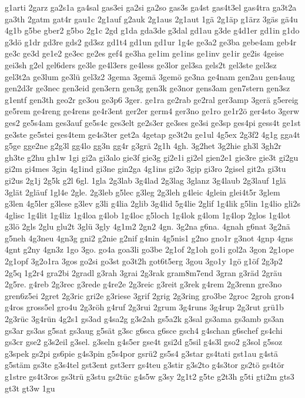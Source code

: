 {g1arti
2garz
ga2s1a
ga4sal
gas3ei
ga2si
ga2so
gas3s
ga4st
gas4t3el
gas4tra
ga3t2a
ga3th
2gatm
gat4r
gau1c
2g1auf
g2auk
2g1aus
2g1aut
1gä
2g1äp
g1ärz
3gäs
gä4u
4g1b
g5be
gber2
g5bo
2g1c
2gd
g1da
gda3de
g3dal
gd1au
g3de
g4d1er
gd1in
g1do
g3dö
g1dr
gd3re
gds2
gd3sz
gd1t4
gd1un
gd1ur
1g4e
ge3a2
ge3ba
gebe4am
geb4r
ge3c
ge3d
ge1e2
ge3ec
ge2es
gef4
ge3ha
ge1im
ge1ins
ge1inv
ge1ir
ge2is
4geise
gei3sh
g2el
gel6ders
ge3le
ge4l3ers
ge4less
ge3lor
gel3sa
gels2t
gel3ste
gel3sz
gel3t2a
ge3lum
ge3lü
gel3z2
3gema
3gemä
3gemö
ge3na
ge4nam
gen2au
gen4aug
gen2d3r
ge3nec
gen3eid
gen3ern
gen3g
gen3k
ge3nor
gens3am
gen7stern
gen3sz
g1entf
gen3th
geo2r
ge3ou
ge3p6
3ger.
ge1ra
ge2rab
ge2ral
ger3amp
3gerä
g5ereig
ge5rem
ge4reng
ge4rens
ge4r3ent
ger2er
germ4
ger3no
ge1ro
ge1r2ö
ger4sto
3gerw
ges2
ge5s4am
ges3auf
ge5s4c
ges3elt
ge2s3er
ge3ses
ge3si
ge3sp
ges4pi
gess4t
ge1st
ge3ste
ge5stei
ges4tem
ge4s3ter
get2a
4getap
ge3t2u
ge1ul
4g5ex
2g3f2
4g1g
gga4t
g5ge
gge2ne
g2g3l
gg4lo
gg3n
gg4r
g3grä
2g1h
4gh.
3g2het
3g2hie
gh3l
3gh2r
gh3te
g2hu
gh1w
1gi
gi2a
gi3alo
gie3f
gie3g
gi2e1i
gi2el
gien2e1
gie3re
gie3t
gi2gu
gi2m
gi4mes
3gin
4g1ind
gi3ne
gin2ga
4g1ins
gi2o
3gip
gi3ro
2gisel
git2a
gi3tu
gi2us
2g1j
2g5k
g2l
6gl.
1gla
2g3lab
3g4lad
2g3lag
3glanz
3g4laub
2g3lauf
1glä
3glät
2gläuf
1gl4e
2gle.
2g3leb
g5lec
g3leg
2g3leh
g4leic
4glein
glei4t5r
3glem
g3len
4g5ler
g3lese
g3lev
g3li
g4lia
2glib
3g4lid
5g4lie
2glif
1g4lik
g5lin
1g4lio
gli2s
4glisc
1g4lit
1g4liz
1g4loa
g4lob
1g4loc
g5loch
1g4lok
g4lom
1g4lop
2glos
1g4lot
g3lö
2gls
2glu
glu2t
3glü
3gly
4g1m2
2gn2
4gn.
3g2na
g6na.
4gnah
g6nat
3g2nä
g5neh
4g3neu
4gn3g
gni2
g2nie
g2nif
g4nin
4g5nis1
g2no
gno1r
g3not
4gnp
4gns
4gnt
g2ny
4gn3z
1go
3go.
go4a
goa3li
go3be
2g1of
2g1oh
go1i
gol2a
3gon
2g1ope
2g1opf
3g2o1ra
3gos
go2si
go3st
go3t2h
got6t5erg
3gou
3go1y
1gö
g1öf
2g3p2
2g5q
1g2r4
gra2bi
2gradl
g3rah
3grai
2g3rak
gram8m7end
3gran
g3räd
2gräu
2g5re.
g4reb
2g3rec
g3rede
g4re2e
2g3reic
g3reit
g3rek
g4rem
2g3renn
gre3no
gren6z5ei
2gret
2g3ric
gri2e
g3riese
3grif
2grig
2g3ring
gro3be
2groc
2groh
gron4
g4ros
gross5el
gro4u
2g3röh
g4ruf
2g3rui
2grum
3g4runs
3g4rup
2g3rut
grü1b
2g3rüc
3g4rün
4g2s1
gs3ad
g4sa2g
g3s2ah
gs5a2k
g3sal
gs3ama
gs3amb
gs3an
gs3ar
gs3as
g5sat
gs3aug
g5sät
g3sc
g6sca
g6sce
gsch4
g4schan
g6schef
gs4chi
gs3cr
gse2
g3s2eil
g3sel.
g3seln
g4s5er
gse4t
gsi2d
g5sil
g4s3l
gso2
g3sol
g5soz
g3spek
gs2pi
gs6pie
g4s3pin
g5s4por
gsrü2
gs5s4
g3star
gs4tati
gst1au
g4stä
g5stäm
gs3te
g3s4tel
gst3ent
gst3err
gs4teu
g3stir
g3s2to
g4s3tor
gs2tö
gs4tör
g1stre
gs4t3ros
gs3trü
g3stu
gs2tüc
g4s5w
g3sy
2g1t2
g5te
g2t3h
g5ti
gti2m
gts3
gt3t
gt3w
1gu
}
